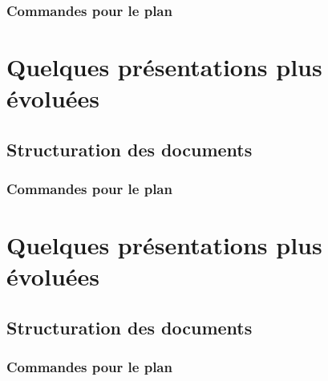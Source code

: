 \documentclass{article}
\begin{document}
\subsubsection{Commandes pour le plan}

\section{Quelques présentations plus évoluées}
\subsection{Structuration des documents}
\subsubsection{Commandes pour le plan}

\section{Quelques présentations plus évoluées}
\subsection{Structuration des documents}
\subsubsection{Commandes pour le plan}







\end{document}
